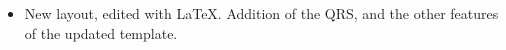 

\subtitle{2.0.1}

\begin{itemize}
\item New layout, edited with LaTeX. Addition of the QRS, and the other features of the updated template.
\end{itemize}
